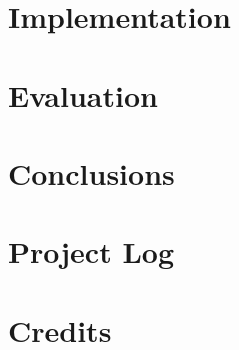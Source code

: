 \documentclass[12pt]{report}
\begin{document}
    \chapter{Implementation}
    

    \setlength{\parindent}{1.5em}
    \chapter{Evaluation}
    

    \chapter{Conclusions}
    

    \appendix
    

    \chapter{Project Log}
    

    \chapter{Credits}
    

    \nocite{*}
    
    
\end{document}
